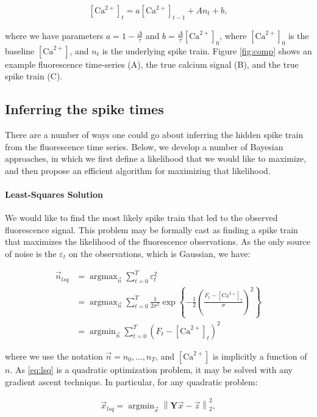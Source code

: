\documentclass[12pt]{article}
\providecommand{\ve}[1]{\vec{#1}}
\providecommand{\ma}[1]{\boldsymbol{#1}}
\providecommand{\norm}[1]{\left \lVert#1 \right  \rVert}
\providecommand{\ve}[1]{\boldsymbol{#1}}
\DeclareMathOperator*{\argmax}{argmax}
\DeclareMathOperator*{\argmin}{argmin}
\newcommand{\Ca}{[\text{Ca}^{2+}]}
\begin{document}
\begin{align} \label{eq:C}
\Ca_t = a \Ca_{t-1} +  A n_t + b,
\end{align}

\noindent where we have parameters $a=1-\frac{\Delta}{\tau}$ and $b=\frac{\Delta}{\tau}\Ca_0$, where $\Ca_0$ is the baseline $\Ca$, and $n_t$ is the underlying spike train. Figure \ref{fig:comp} shows an example fluorescence time-series (A), the true calcium signal (B), and the true spike train (C).

\subsection{Inferring the spike times}

There are a number of ways one could go about inferring the hidden spike train from the fluorescence time series.  Below, we develop a number of Bayesian approaches, in which we first define a likelihood that we would like to maximize, and then propose an efficient algorithm for maximizing that likelihood.

\paragraph{Least-Squares Solution}

We would like to find the most likely spike train that led to the observed fluorescence signal. This problem may be formally cast as finding a spike train that maximizes the likelihood of the fluorescence observations.  As the only source of noise is the $\varepsilon_t$ on the observations, which is Gaussian, we have: 

\begin{align} \label{eq:lsq}
\ve{n}_{lsq} &= \argmax_{\ve{n}} \sum_{t=0}^T \varepsilon_t^2\\
&= \argmax_{\ve{n}} \sum_{t=0}^T \frac{1}{2\sigma^2}\exp\left\{-\frac{1}{2}\left(\frac{F_t-\Ca_t}{\sigma}\right)^2\right\}\\
&= \argmin_{\ve{n}} \sum_{t=0}^T (F_t - \Ca_t)^2
\end{align}

\noindent where we use the notation $\ve{n}=n_0,\ldots, n_T$, and $\Ca$ is implicitly a function of $n$.  As \eqref{eq:lsq} is a quadratic optimization problem, it may be solved with any gradient ascent technique.  In particular, for any quadratic problem:

\begin{align} \label{eq:lsq0}
\ve{x}_{lsq} = \argmin_{\ve{x}} \norm{\ma{Y} \ve{x} - \ve{z}}_2^2,
\end{align}
\end{document}
